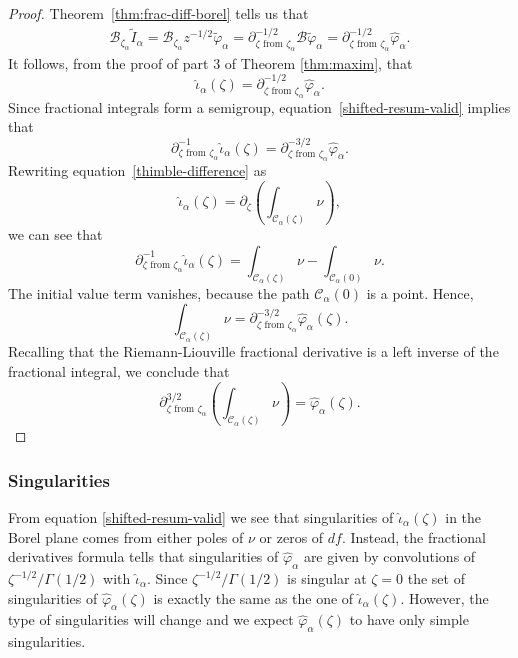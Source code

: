 \documentclass[11pt,a4paper,twoside,leqno,noamsfonts]{amsart}
\numberwithin{equation}{section}
\begin{document}
\begin{proof}
Theorem~\ref{thm:frac-diff-borel} tells us that
\begin{align*}
\mathcal{B}_{\zeta_\alpha} \tilde{I}_\alpha  = \mathcal{B}_{\zeta_\alpha} z^{-1/2} \tilde{\varphi}_\alpha = \partial^{-1/2}_{\zeta \text{ from } \zeta_\alpha} \mathcal{B} \tilde{\varphi}_\alpha = \partial^{-1/2}_{\zeta \text{ from } \zeta_\alpha} \hat{\varphi}_\alpha.
\end{align*}
It follows, from the proof of part $3$ of Theorem \ref{thm:maxim}, that
\begin{equation}\label{shifted-resum-valid}
\hat{\iota}_\alpha(\zeta) = \partial^{-1/2}_{\zeta \text{ from } \zeta_\alpha} \hat{\varphi}_\alpha.
\end{equation}
Since fractional integrals form a semigroup, equation~\eqref{shifted-resum-valid} implies that
\[ \partial^{-1}_{\zeta \text{ from } \zeta_\alpha} \hat{\iota}_\alpha(\zeta) = \partial^{-3/2}_{\zeta \text{ from } \zeta_\alpha} \hat{\varphi}_\alpha. \]
Rewriting equation~\eqref{thimble-difference} as
\[ \hat{\iota}_\alpha(\zeta) = \partial_\zeta \left( \int_{\mathcal{C}_\alpha(\zeta)} \nu \right), \]
we can see that
\[ \partial^{-1}_{\zeta \text{ from } \zeta_\alpha} \hat{\iota}_\alpha(\zeta) = \int_{\mathcal{C}_\alpha(\zeta)} \nu - \int_{\mathcal{C}_\alpha(0)} \nu. \]
The initial value term vanishes, because the path $\mathcal{C}_\alpha(0)$ is a point. Hence,
\[ \int_{\mathcal{C}_\alpha(\zeta)} \nu = \partial^{-3/2}_{\zeta \text{ from } \zeta_\alpha} \hat{\varphi}_\alpha(\zeta). \]
Recalling that the Riemann-Liouville fractional derivative is a left inverse of the fractional integral, we conclude that
\[ \partial^{3/2}_{\zeta \text{ from } \zeta_\alpha} \left( \int_{\mathcal{C}_\alpha(\zeta)} \nu \right) = \hat{\varphi}_\alpha(\zeta). \]
\end{proof}


\subsubsection{Singularities} 
From equation \eqref{shifted-resum-valid} we see that singularities of $\hat{\iota}_{\alpha}(\zeta)$ in the Borel plane comes from either poles of $\nu$ or zeros of $df$. Instead, the fractional derivatives formula tells that singularities of $\hat{\varphi}_\alpha$ are given by convolutions of $\zeta^{-1/2}/\Gamma(1/2)$ with $\hat{\iota}_{\alpha}$. Since $\zeta^{-1/2}/\Gamma(1/2)$ is singular at $\zeta=0$ the set of singularities of $\hat{\varphi}_{\alpha}(\zeta)$ is exactly the same as the one of $\hat{\iota}_{\alpha}(\zeta)$. However, the type of singularities will change and we expect $\hat{\varphi}_{\alpha}(\zeta)$ to have only simple singularities.
\end{document}
